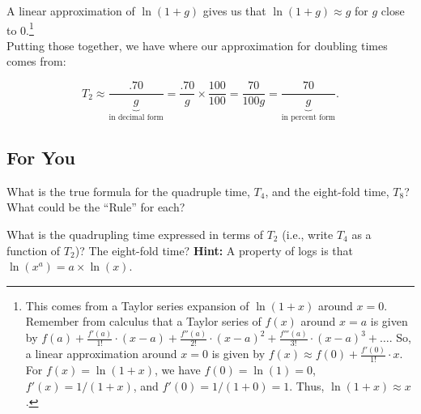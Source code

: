 \documentclass[11pt]{article}\usepackage[]{graphicx}\usepackage[]{color}
\begin{document}
A linear approximation of $\ln(1+g)$ gives us that $\ln(1+g) \approx g$ for $g$ close to 0.\footnote{This comes from a Taylor series expansion of $\ln(1+x)$ around $x=0$. Remember from calculus that a Taylor series of $f(x)$ around $x=a$ is given by $f(a) + \frac{f'(a)}{1!}\cdot(x-a) + \frac{f''(a)}{2!}\cdot(x-a)^2 + \frac{f'''(a)}{3!}\cdot(x-a)^3 + \dots$. So, a linear approximation around $x=0$ is given by $f(x) \approx f(0) + \frac{f'(0)}{1!}\cdot x$. For $f(x) = \ln(1+x)$, we have $f(0) = \ln(1) =0$, $f'(x) = 1/(1+x)$, and $f'(0) = 1/(1+0) = 1$. Thus, $\ln(1+x) \approx x$.} 
\\

Putting those together, we have where our approximation for doubling times comes from: 


\[T_2 \approx \frac{.70}{\underbrace{g}_{\text{in decimal form}}} = \frac{.70}{g} \times \frac{100}{100} = \frac{70}{100g} = \frac{70}{\underbrace{g}_{\text{in percent form}}}.  \]

\subsection*{For You}
What is the true formula for the quadruple time, $T_4$, and the eight-fold time, $T_8$? What could be the ``Rule'' for each?
\vspace{3cm}


\color{black}
What is the quadrupling time expressed in terms of $T_2$ (i.e., write $T_4$ as a function of $T_2$)? The eight-fold time? \textbf{Hint:} A property of logs is that $\ln(x^a) = a\times \ln(x)$.
\end{document}
